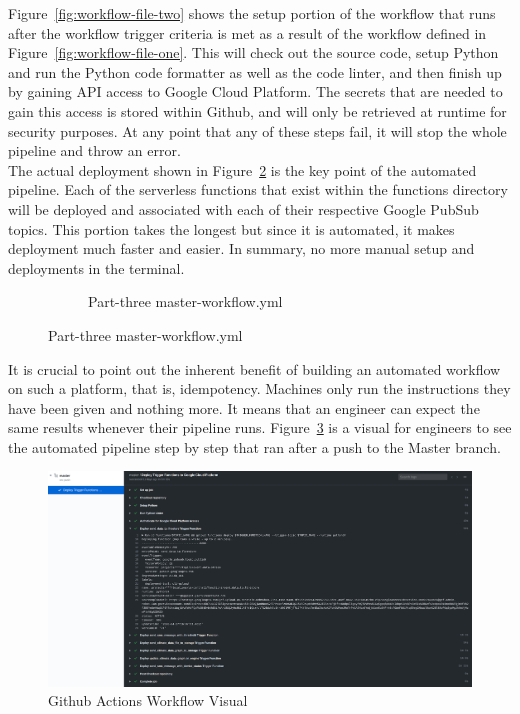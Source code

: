 \documentclass{article}
\begin{document}
Figure~\ref{fig:workflow-file-two} shows the setup portion of the workflow that runs after the workflow trigger criteria is met as a result of the workflow defined in Figure~\ref{fig:workflow-file-one}. This will check out the source code, setup Python and run the Python code formatter as well as the code linter, and then finish up by gaining API access to Google Cloud Platform. The secrets that are needed to gain this access is stored within Github, and will only be retrieved at runtime for security purposes. At any point that any of these steps fail, it will stop the whole pipeline and throw an error.\\

The actual deployment shown in Figure~\ref{fig:workflow-file-three} is the key point of the automated pipeline. Each of the serverless functions that exist within the functions directory will be deployed and associated with each of their respective Google PubSub topics. This portion takes the longest but since it is automated, it makes deployment much faster and easier. In summary, no more manual setup and deployments in the terminal.

\begin{figure}[H]
	\begin{figure}[H]
		
		\caption{Part-three master-workflow.yml}
		\label{fig:workflow-file-three}
	\end{figure}
\end{figure}

It is crucial to point out the inherent benefit of building an automated workflow on such a platform, that is, idempotency. Machines only run the instructions they have been given and nothing more. It means that an engineer can expect the same results whenever their pipeline runs. Figure~\ref{fig:workflow-visual} is a visual for engineers to see the automated pipeline step by step that ran after a push to the Master branch.\\

\begin{figure}[H]
	\center
	\includegraphics[width=\textwidth]{images/github-actions.png}
	\caption{Github Actions Workflow Visual}
	\label{fig:workflow-visual}
\end{figure}
\end{document}
